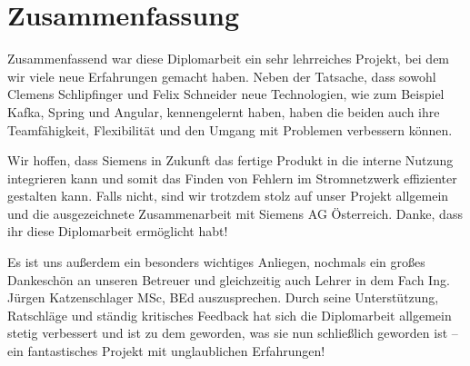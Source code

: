 \section{Zusammenfassung}

Zusammenfassend war diese Diplomarbeit ein sehr lehrreiches Projekt, bei dem wir viele neue Erfahrungen gemacht haben. Neben der Tatsache, dass sowohl Clemens Schlipfinger und Felix Schneider neue Technologien, wie zum Beispiel Kafka, Spring und Angular, kennengelernt haben, haben die beiden auch ihre Teamfähigkeit, Flexibilität und den Umgang mit Problemen verbessern können.

Wir hoffen, dass Siemens in Zukunft das fertige Produkt in die interne Nutzung integrieren kann und somit das Finden von Fehlern im Stromnetzwerk effizienter gestalten kann. Falls nicht, sind wir trotzdem stolz auf unser Projekt allgemein und die ausgezeichnete Zusammenarbeit mit Siemens AG Österreich. Danke, dass ihr diese Diplomarbeit ermöglicht habt!

Es ist uns außerdem ein besonders wichtiges Anliegen, nochmals ein großes Dankeschön an unseren Betreuer und gleichzeitig auch Lehrer in dem Fach  Ing. Jürgen Katzenschlager MSc, BEd auszusprechen. Durch seine Unterstützung, Ratschläge und ständig kritisches Feedback hat sich die Diplomarbeit allgemein stetig verbessert und ist zu dem geworden, was sie nun schließlich geworden ist -- ein fantastisches Projekt mit unglaublichen Erfahrungen!